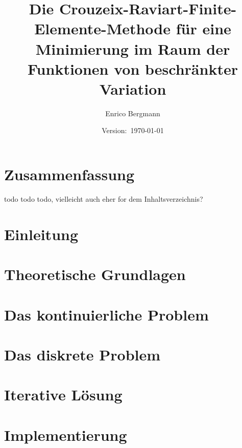 \documentclass[draft=false,twoside,11pt]{scrreprt}
\title{Die Crouzeix-Raviart-Finite-Elemente-Methode für eine Minimierung im Raum
der Funktionen von beschränkter Variation}
\author{Enrico Bergmann}
\date{Version:~\today}
\begin{document}
\maketitle
\tableofcontents

\chapter*{Zusammenfassung}
todo todo todo, vielleicht auch eher for dem Inhaltsverzeichnis?



\chapter{Einleitung}
\label{chap:introduction}


\chapter{Theoretische Grundlagen}
\label{chap:theoreticalBasics}


\chapter{Das kontinuierliche Problem}
\label{chap:continuousProblem}


\chapter{Das diskrete Problem}
\label{chap:discreteProblem}


\chapter{Iterative Lösung}
\label{chap:algorithm}


\chapter{Implementierung}
\label{chap:implementation}

\end{document}
